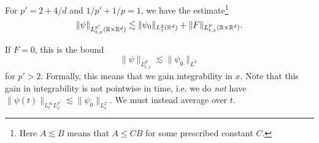 \begin{theorem}\label{thm:strichartz}
  For $p' = 2 + 4 / d$ and $1 / p' + 1 / p = 1$, we have the estimate\footnote{Here $A \lesssim B$ means that $A \le CB$ for some prescribed constant $C$.}
  \[
    \|\psi\|_{L^{p'}_{t, x}(\mathbb{R} \times \mathbb{R}^d)}
    \lesssim \|\psi_0\|_{L^2_x(\mathbb{R}^d)}
    + \|F\|_{L^{p}_{t, x}(\mathbb{R} \times \mathbb{R}^d)}.
  \]
\end{theorem}

\begin{remark}
  If $F = 0$, this is the bound
  \[
    \|\psi\|_{L^{p'}_{t, x}}
    \lesssim \|\psi_0\|_{L^2}
  \]
  for $p' > 2$. Formally, this means that we gain
  integrability in $x$. Note that this gain in
  integrability is not pointwise in time, i.e.
  we do \emph{not} have $\|\psi(t)\|_{L^\infty_t L^{p'}_x} \lesssim \|\psi_0\|_{L^2_x}$. We must instead average
  over $t$.
\end{remark}


